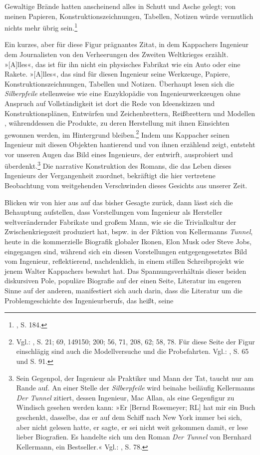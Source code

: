\documentclass[%
	fontsize=10pt,%
	twoside,%
	headings=optiontoheadandtoc,%
	showtrims]{scrbook}
\renewenvironment{quote}{%
  \addmargin[\genericindent]{0pt}%
  \KOMAoptions{parskip=true}%
  \ifdim\parskip>0pt\else\addvspace{\intextsep}\fi
}{%
  \par
  \endaddmargin\vspace{\intextsep}
}
\begin{document}
\begin{quote}
\par Gewaltige Brände hatten anscheinend alles in Schutt und Asche gelegt; von meinen Papieren, Konstruktionszeichnungen, Tabellen, Notizen würde vermutlich nichts mehr übrig sein.\footnote{\cite[][]{kappacher2000a}, S. 184.} 
\end{quote}
\par Ein kurzes, aber für diese Figur prägnantes Zitat, in dem Kappachers Ingenieur dem Journalisten von den Verheerungen des Zweiten Weltkrieges erzählt. »{[}A{]}lles«, das ist für ihn nicht ein physisches Fabrikat wie ein Auto oder eine Rakete. »{[}A{]}lles«, das sind für diesen Ingenieur seine Werkzeuge, Papiere, Konstruktionszeichnungen, Tabellen und Notizen. Überhaupt lesen sich die \emph{Silberpfeile} stellenweise wie eine Enzyklopädie von Ingenieurwerkzeugen \textendash{} ohne Anspruch auf Vollständigkeit ist dort die Rede von Ideenskizzen und Konstruktionsplänen, Entwürfen und Zeichenbrettern, Reißbrettern und Modellen \textendash{}, währenddessen die Produkte, zu deren Herstellung mit ihnen Einsichten gewonnen werden, im Hintergrund bleiben.\footnote{Vgl.: \cite[][]{kappacher2000a}, S. 21; 69, 149\textendash{}150; 200; 56, 71, 208, 62; 58, 78. Für diese Seite der Figur einschlägig sind auch die Modellversuche und die Probefahrten. Vgl.: \cite[][]{kappacher2000a}, S. 65 und S. 91.}  Indem uns Kappacher seinen Ingenieur mit diesen Objekten hantierend und von ihnen erzählend zeigt, entsteht vor unseren Augen das Bild eines Ingenieurs, der entwirft, ausprobiert und überdenkt.\footnote{Sein Gegenpol, der Ingenieur als Praktiker und Mann der Tat, taucht nur am Rande auf. An einer Stelle der \emph{Silberpfeile} wird beinahe beiläufig Kellermanns \emph{Der Tunnel} zitiert, dessen Ingenieur, Mac Allan, als eine Gegenfigur zu Windisch gesehen werden kann: »Er {[}Bernd Rosemeyer; RL{]} hat mir ein Buch geschenkt, dasselbe, das er auf dem Schiff nach New York immer bei sich, aber nicht gelesen hatte, er sagte, er sei nicht weit gekommen damit, er lese lieber Biografien. Es handelte sich um den Roman \emph{Der Tunnel} von Bernhard Kellermann, ein Bestseller.« Vgl.: \cite[][]{kappacher2000a}, S. 78.}  Die narrative Konstruktion des Romans, die das Leben dieses Ingenieurs der Vergangenheit zuordnet, bekräftigt die hier vertretene Beobachtung vom weitgehenden Verschwinden dieses Gesichts aus unserer Zeit.\par Blicken wir von hier aus auf das bisher Gesagte zurück, dann lässt sich die Behauptung aufstellen, dass Vorstellungen vom Ingenieur als Hersteller weltverändernder Fabrikate und großem Mann, wie sie die Trivialkultur der Zwischenkriegszeit produziert hat, bspw. in der Fiktion von Kellermanns \emph{Tunnel}, heute in die kommerzielle Biografik globaler Ikonen, Elon Musk oder Steve Jobs, eingegangen sind, während sich ein diesen Vorstellungen entgegengesetztes Bild vom Ingenieur, reflektierend, nachdenklich, in einem stillen Schreibprojekt wie jenem Walter Kappachers bewahrt hat. Das Spannungsverhältnis dieser beiden diskursiven Pole, populäre Biografie auf der einen Seite, Literatur im engeren Sinne auf der anderen, manifestiert sich auch darin, dass die Literatur um die Problemgeschichte des Ingenieurberufs, das heißt, seine 
\end{document}
